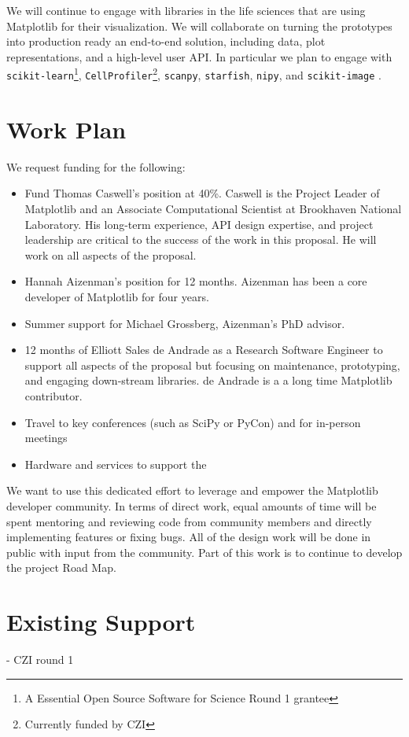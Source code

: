 \documentclass[12pt,letterpaper]{article}  %
\begin{document}
We will continue to engage with libraries in the life sciences that
are using Matplotlib for their visualization. We will collaborate on
turning the prototypes into production ready an end-to-end solution,
including data, plot representations, and a high-level user API.  In
particular we plan to engage with \texttt{scikit-learn}\footnote{A
Essential Open Source Software for Science Round 1 grantee},
\texttt{CellProfiler}\footnote{Currently funded by CZI\label{f:czi}},
\texttt{scanpy}, \texttt{starfish},
\texttt{nipy}, and \texttt{scikit-image}
\cite{10.7717/peerj.453,Carpenter2006, Wolf2018}.


\section{Work Plan}

We request funding for the following:

\begin{itemize}[noitemsep]

\item Fund Thomas Caswell's position at 40\%.  Caswell is the Project Leader of Matplotlib and an Associate
  Computational Scientist at Brookhaven National Laboratory.  His
  long-term experience, API design expertise, and project leadership
  are critical to the success of the work in this proposal.  He will work
  on all aspects of the proposal.
\item Hannah Aizenman's position for 12 months.  Aizenman has
  been a core developer of Matplotlib for four years.
\item Summer support for Michael Grossberg, Aizenman's PhD advisor.
\item 12 months of Elliott Sales de Andrade as a Research Software
  Engineer to support all aspects of the proposal but focusing on
  maintenance, prototyping, and engaging down-stream libraries.  de Andrade is a
  a long time Matplotlib contributor.
\item Travel to key conferences (such as SciPy or PyCon) and for in-person meetings
\item Hardware and services to support the
\end{itemize}

We want to use this dedicated effort to leverage and empower the
Matplotlib developer community.  In terms of direct work, equal
amounts of time will be spent mentoring and reviewing code from
community members and directly implementing features or fixing bugs.
All of the design work will be done in public with input from the
community. Part of this work is to continue to develop the project
Road Map.



\section{Existing Support}

 - CZI round 1



\clearpage

\end{document}
